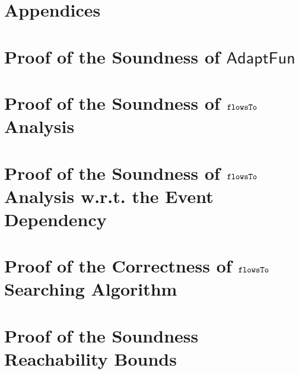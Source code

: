 \documentclass[a4paper,11pt]{article}
\newcommand{\THESYSTEM}{\textsf{AdaptFun}}
\begin{document}
\section*{Appendices}
\section{Proof of the Soundness of $\THESYSTEM$}

\clearpage
\section{Proof of the Soundness of $\mathtt{flowsTo}$ Analysis}

\clearpage
\section{Proof of the Soundness of $\mathtt{flowsTo}$ Analysis w.r.t. the Event Dependency}

\clearpage
\section{Proof of the Correctness of $\mathtt{flowsTo}$ Searching Algorithm}
% 

\clearpage
\section{Proof of the Soundness Reachability Bounds}

\clearpage



\end{document}
